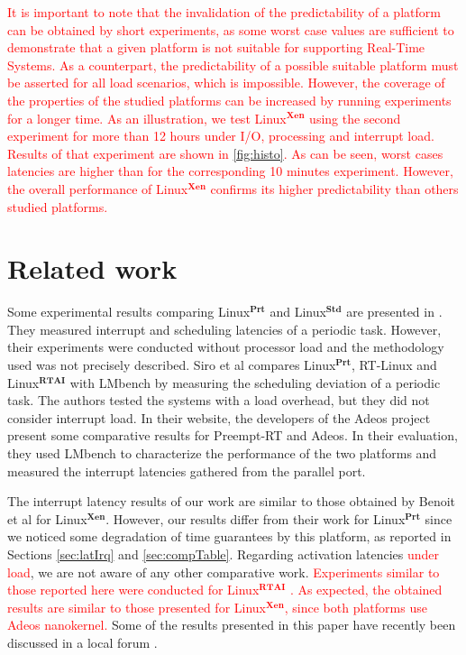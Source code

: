 \documentclass{acm_proc_article-sp}
\newcommand{\col}[1]{\textcolor{red}{#1}}
\newcommand{\preemptt}{{Preempt-RT }}
\begin{document}
\col{It is important to note that the invalidation of the predictability of a
  platform can be obtained by short experiments, as some worst case values are
  sufficient to demonstrate that a given platform is not suitable for supporting
  Real-Time Systems. As a counterpart, the predictability of a possible suitable
  platform must be asserted for all load scenarios, which is impossible.  However,
  the coverage of the properties of the studied platforms can be increased by
  running experiments for a longer time. As an illustration, we test
  Linux$^\mathbf{Xen}$ using the second experiment for more than 12 hours under I/O,
  processing and interrupt load. Results of that experiment are shown in
  \ref{fig:histo}.  As can be seen, worst cases latencies are higher than for the
  corresponding 10 minutes experiment. However, the overall performance of
  Linux$^\mathbf{Xen}$ confirms its higher predictability than others studied
  platforms. }


\section{Related work}
\label{sec:trabRel}

Some experimental results comparing Linux$^{\mathbf{Prt}}$ and
Linux$^{\mathbf{Std}}$ are presented in \cite{Rostedt07}. They measured interrupt
and scheduling latencies of a periodic task. However, their experiments were
conducted without processor load and the methodology used was not precisely
described. Siro et al \cite{Siro07} compares Linux$^{\mathbf{Prt}}$, RT-Linux
\cite{rtLinux} and Linux$^{\mathbf{RTAI}}$ \cite{RTAI} with LMbench \cite{McVoy96}
by measuring the scheduling deviation of a periodic task. The authors tested the
systems with a load overhead, but they did not consider interrupt load. In their
website, the developers of the Adeos project \cite{Benoit05} present some
comparative results for \preemptt and Adeos. In their evaluation, they used LMbench
\cite{McVoy96} to characterize the performance of the two platforms and measured the
interrupt latencies gathered from the parallel port.

The interrupt latency results of our work are similar to those obtained by Benoit et
al \cite{Benoit05} for Linux$^{\mathbf{Xen}}$. However, our results differ from
their work for Linux$^{\mathbf{Prt}}$ since we noticed some degradation of time
guarantees by this platform, as reported in Sections \ref{sec:latIrq} and
\ref{sec:compTable}.  Regarding activation latencies \col{under load}, we are not
aware of any other comparative work. \col{Experiments similar to those reported here were
conducted for Linux$^{\mathbf{RTAI}}$ \cite{Regnier08b}. As expected, the obtained 
results are similar to those presented for Linux$^{\mathbf{Xen}}$, since both platforms use Adeos
nanokernel. } Some of the results presented in this paper have recently been
discussed in a local forum \cite{Regnier08-wso}.
\end{document}
